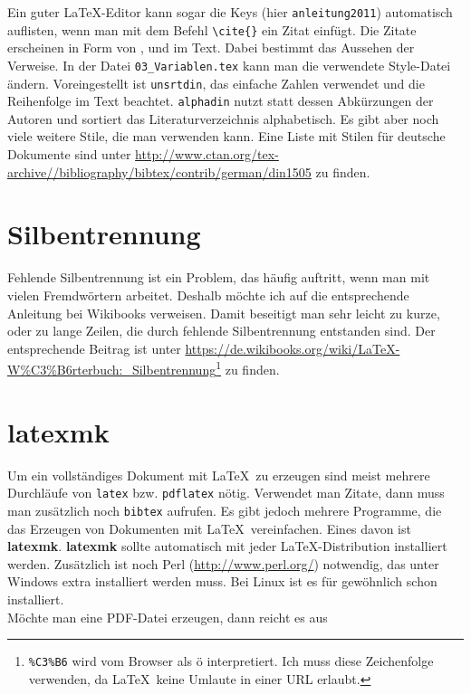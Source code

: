 Ein guter \LaTeX-Editor kann sogar die Keys (hier \verb+anleitung2011+) automatisch auflisten, wenn man mit dem Befehl \verb+\cite{}+ ein Zitat einfügt. Die Zitate erscheinen in Form von \cite{heil2012}, \cite{anleitung2012} und \cite{anleitung2013} im Text. Dabei bestimmt \verb++ das Aussehen der Verweise. In der Datei \verb+03_Variablen.tex+ kann man die verwendete Style-Datei ändern. Voreingestellt ist \verb+unsrtdin+, das einfache Zahlen verwendet und die Reihenfolge im Text beachtet. \verb+alphadin+ nutzt statt dessen Abkürzungen der Autoren und sortiert das Literaturverzeichnis alphabetisch. Es gibt aber noch viele weitere Stile, die man verwenden kann. Eine Liste mit Stilen für deutsche Dokumente sind unter \url{http://www.ctan.org/tex-archive//bibliography/bibtex/contrib/german/din1505} zu finden.

\section{Silbentrennung}

Fehlende Silbentrennung ist ein Problem, das häufig auftritt, wenn man mit vielen Fremdwörtern arbeitet. Deshalb möchte ich auf die entsprechende Anleitung bei Wikibooks verweisen. Damit beseitigt man sehr leicht zu kurze, oder zu lange Zeilen, die durch fehlende Silbentrennung entstanden sind. Der entsprechende Beitrag ist unter \url{https://de.wikibooks.org/wiki/LaTeX-W\%C3\%B6rterbuch:_Silbentrennung}\footnote{\texttt{\%C3\%B6} wird vom Browser als ö interpretiert. Ich muss diese Zeichenfolge verwenden, da \LaTeX\ keine Umlaute in einer URL erlaubt.} zu finden.

\section{latexmk}

Um ein vollständiges Dokument mit \LaTeX\ zu erzeugen sind meist mehrere Durchläufe von \verb+latex+ bzw. \verb+pdflatex+ nötig. Verwendet man Zitate, dann muss man zusätzlich noch \verb+bibtex+ aufrufen. Es gibt jedoch mehrere Programme, die das Erzeugen von Dokumenten mit \LaTeX\ vereinfachen. Eines davon ist \textbf{latexmk}. \textbf{latexmk} sollte automatisch mit jeder \LaTeX-Distribution installiert werden. Zusätzlich ist noch Perl (\url{http://www.perl.org/}) notwendig, das unter Windows extra installiert werden muss. Bei Linux ist es für gewöhnlich schon installiert.\\
Möchte man eine PDF-Datei erzeugen, dann reicht es aus 

